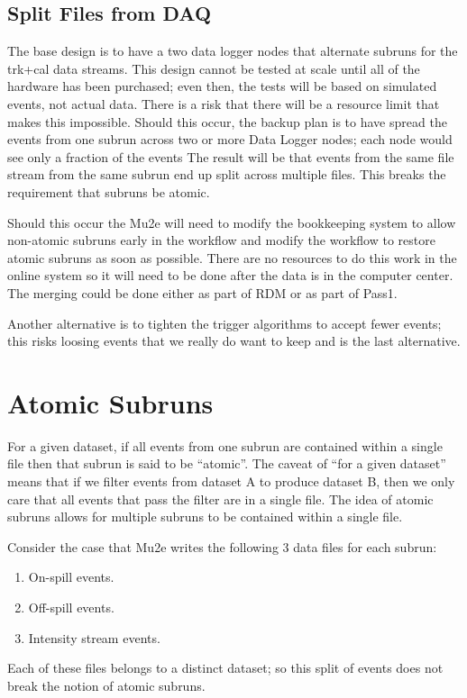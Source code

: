 \section{Split Files from DAQ}
\label{sec:Risk:SplitFiles}

The base design is to have a two data logger nodes that alternate subruns
for the trk+cal data streams.
This design cannot be tested at scale until all of the hardware has been purchased;
even then, the tests will be based on simulated events, not actual data.
There is a risk that there will be a resource limit that makes this impossible.
Should this occur, the backup plan is to have spread the events from one
subrun across two or more Data Logger nodes;
each node would see only a fraction of the events
The result will be that events from the same file stream
from the same subrun end up split across multiple files.
This breaks the requirement that subruns be atomic.

Should this occur the Mu2e will need to modify the bookkeeping system to allow non-atomic subruns early
in the workflow and modify the workflow to restore atomic subruns as soon as possible.
There are no resources to do this work in the online system so it will need to be done
after the data is in the computer center.
The merging could be done either as part of RDM or as part of Pass1.

Another alternative is to tighten the trigger algorithms to accept fewer events;
this risks loosing events that we really do want to keep and is the last alternative.

\appendix

\chapter{Atomic Subruns}
\label{ch:AtomicSubrunsExtendedDefinition}

For a given dataset, if all events from one subrun are contained within a single \art file
then that subrun is said to be ``atomic''.
The caveat of ``for a given dataset'' means that if we filter events from dataset A
to produce dataset B, then we only care that all events that pass the filter are in a single file.
The idea of atomic subruns allows for multiple subruns to be contained within a single file.

Consider the case that Mu2e writes the following 3 data files for each subrun:
\begin{enumerate}
\item On-spill events.
\item Off-spill events.
\item Intensity stream events.
\end{enumerate}
Each of these files belongs to a distinct dataset; so this split of events does not break the notion
of atomic subruns.

